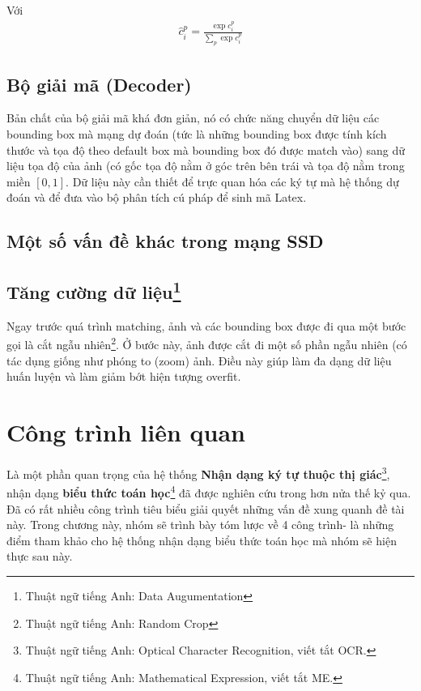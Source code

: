 \documentclass[a4paper,12pt]{article}
\begin{document}
	Với \begin{align}\hat{c}_i^p = \frac{\exp{c_i^p}}{\sum_p \exp{c}_i^p}\end{align}
	
	\subsection{Bộ giải mã (Decoder)}
	
	Bản chất của bộ giải mã khá đơn giản, nó có chức năng chuyển dữ liệu các bounding box mà mạng dự đoán (tức là những bounding box được tính kích thước và tọa độ theo default box mà bounding box đó được match vào) sang dữ liệu tọa độ của ảnh (có gốc tọa độ nằm ở góc trên bên trái và tọa độ nằm trong miền $[0, 1]$. Dữ liệu này cần thiết để trực quan hóa các ký tự mà hệ thống dự đoán và để đưa vào bộ phân tích cú pháp để sinh mã Latex.
	
	\subsection{Một số vấn đề khác trong mạng SSD\cite{liu2016ssd}}
	\subsection*{Tăng cường dữ liệu\footnote{Thuật ngữ tiếng Anh: Data Augumentation}}
	
	Ngay trước quá trình matching, ảnh và các bounding box được đi qua một bước gọi là cắt ngẫu nhiên\footnote{Thuật ngữ tiếng Anh: Random Crop}. Ở bước này, ảnh được cắt đi một số phần ngẫu nhiên (có tác dụng giống như phóng to (zoom) ảnh. Điều này giúp làm đa dạng dữ liệu huấn luyện và làm giảm bớt hiện tượng overfit.
	
	
	
	
	
	\newpage
	\section{Công trình liên quan}
	Là một phần quan trọng của hệ thống \textbf{Nhận dạng ký tự thuộc thị giác}\footnote{Thuật ngữ tiếng Anh: Optical Character Recognition, viết tắt OCR.}, nhận dạng \textbf{biểu thức toán học}\footnote{Thuật ngữ tiếng Anh: Mathematical Expression, viết tắt ME.} đã được nghiên cứu trong hơn nửa thế kỷ qua. Đã có rất nhiều công trình tiêu biểu giải quyết những vấn đề xung quanh đề tài này. Trong chương này, nhóm sẽ trình bày tóm lược về 4 công trình- là những điểm tham khảo cho hệ thống nhận dạng biểu thức toán học mà nhóm sẽ hiện thực sau này.\\
\end{document}
